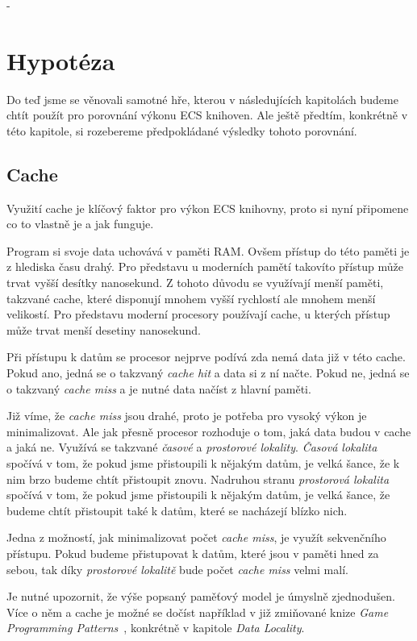 
-\chapter{Hypotéza}
\label{chap:hypothesis}
Do teď jsme se věnovali samotné hře, kterou v následujících kapitolách budeme chtít použít pro porovnání výkonu ECS knihoven. Ale ještě předtím, konkrétně v této kapitole, si rozebereme předpokládané výsledky tohoto porovnání.

\section{Cache}
Využití cache je klíčový faktor pro výkon ECS knihovny, proto si nyní připomene co to vlastně je a jak funguje.

Program si svoje data uchovává v paměti RAM. Ovšem přístup do této paměti je z hlediska času drahý. Pro představu u moderních pamětí takovíto přístup může trvat vyšší desítky nanosekund. Z tohoto důvodu se využívají menší paměti, takzvané cache, které disponují mnohem vyšší rychlostí ale mnohem menší velikostí. Pro představu moderní procesory používají cache, u kterých přístup může trvat menší desetiny nanosekund.

Při přístupu k datům se procesor nejprve podívá zda nemá data již v této cache. Pokud ano, jedná se o takzvaný \textit{cache hit} a data si z ní načte. Pokud ne, jedná se o takzvaný \textit{cache miss} a je nutné data načíst z hlavní paměti. 

Již víme, že \textit{cache miss} jsou drahé, proto je potřeba pro vysoký výkon je minimalizovat. Ale jak přesně procesor rozhoduje o tom, jaká data budou v cache a jaká ne. Využívá se takzvané \textit{časové} a \textit{prostorové lokality}. \textit{Časová lokalita} spočívá v tom, že pokud jsme přistoupili k nějakým datům, je velká šance, že k nim brzo budeme chtít přistoupit znovu. Nadruhou stranu \textit{prostorová lokalita} spočívá v tom, že pokud jsme přistoupili k nějakým datům, je velká šance, že budeme chtít přistoupit také k datům, které se nacházejí blízko nich.

Jedna z možností, jak minimalizovat počet \textit{cache miss}, je využít sekvenčního přístupu. Pokud budeme přistupovat k datům, které jsou v paměti hned za sebou, tak díky \textit{prostorové lokalitě} bude počet \textit{cache miss} velmi malí.

Je nutné upozornit, že výše popsaný paměťový model je úmyslně zjednodušen. Více o něm a cache je možné se dočíst například v již zmiňované knize \textit{Game Programming Patterns}~\cite{nystrom2014game}, konkrétně v kapitole \textit{Data Locality}.

